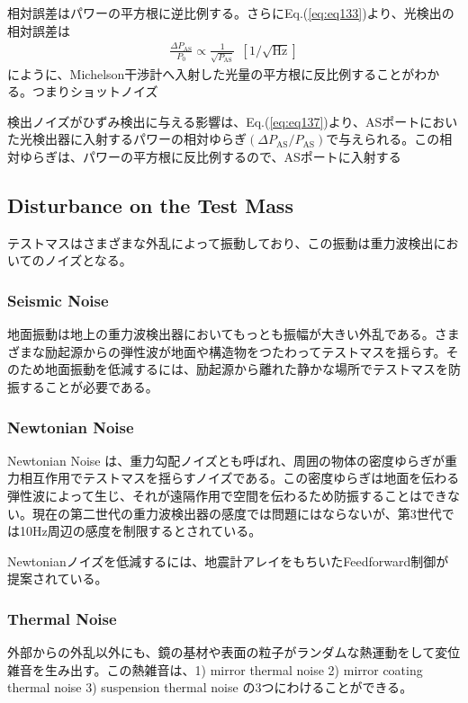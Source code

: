 相対誤差はパワーの平方根に逆比例する。さらにEq.(\ref{eq:eq133})より、光検出の相対誤差は
\begin{eqnarray}
  \frac{\Delta P_{\mathrm{AS}}}{P_{\mathrm{0}}}  \propto \frac{1}{\sqrt{P_{\mathrm{AS}}}}\ \ [1/\sqrt{\mathrm{Hz}}]  \label{eq:eq136}
\end{eqnarray}
にように、Michelson干渉計へ入射した光量の平方根に反比例することがわかる。つまりショットノイズ


検出ノイズがひずみ検出に与える影響は、Eq.(\ref{eq:eq137})より、ASポートにおいた光検出器に入射するパワーの相対ゆらぎ$(\Delta P_{\mathrm{AS}}/P_{\mathrm{AS}})$で与えられる。この相対ゆらぎは、パワーの平方根に反比例するので、ASポートに入射する

\subsection{Disturbance on the Test Mass}
テストマスはさまざまな外乱によって振動しており、この振動は重力波検出においてのノイズとなる。

\subsubsection{Seismic Noise}
地面振動は地上の重力波検出器においてもっとも振幅が大きい外乱である。さまざまな励起源からの弾性波が地面や構造物をつたわってテストマスを揺らす。そのため地面振動を低減するには、励起源から離れた静かな場所でテストマスを防振することが必要である。

\subsubsection{Newtonian Noise}
Newtonian Noise は、重力勾配ノイズとも呼ばれ、周囲の物体の密度ゆらぎが重力相互作用でテストマスを揺らすノイズである。この密度ゆらぎは地面を伝わる弾性波によって生じ、それが遠隔作用で空間を伝わるため防振することはできない。現在の第二世代の重力波検出器の感度では問題にはならないが、第3世代では10Hz周辺の感度を制限するとされている。

Newtonianノイズを低減するには、地震計アレイをもちいたFeedforward制御が提案されている。

\subsubsection{Thermal Noise}
外部からの外乱以外にも、鏡の基材や表面の粒子がランダムな熱運動をして変位雑音を生み出す。この熱雑音は、1) mirror thermal noise 2) mirror coating thermal noise 3) suspension thermal noise の3つにわけることができる\cite{dan2016study}。

